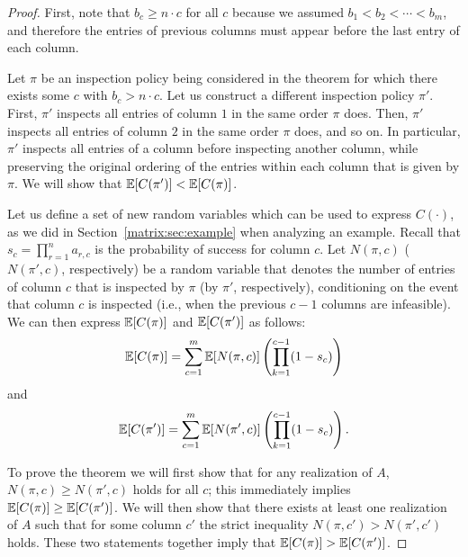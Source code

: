  \begin{proof}
 First, note that $b_c \geq n\cdot c$ for all $c$ because we assumed $b_1 < b_2 < \cdots < b_m$, and therefore the entries of previous columns must appear before the last entry of each column.

 Let $\pi$ be an inspection policy being considered in the theorem for which there exists some $c$ with $b_{c} > n \cdot c$.
 Let us construct a different inspection policy $\pi'$.
 First, $\pi'$ inspects all entries of column $1$ in the same order $\pi$ does. 
 Then, $\pi'$ inspects all entries of column $2$ in the same order $\pi$ does, and so on. 
 In particular, $\pi'$ inspects all entries of a column before inspecting another column, while preserving the original ordering of the entries within each column that is given by $\pi$. 
 We will show that $\mathbb{E}[C(\pi')] < \mathbb{E}[C(\pi)]$.

 Let us define a set of new random variables which can be used to express $C(\cdot)$, as we did in Section~\ref{matrix:sec:example} when analyzing an example.
 Recall that $s_c = \prod_{r=1}^{n} a_{r,c}$ is the probability of success for column $c$.
 Let $N(\pi, c)$ ($N(\pi', c)$, respectively) be a random variable that denotes the number of entries of column $c$ that is inspected by $\pi$ (by $\pi'$, respectively), conditioning on the event that column $c$ is inspected (i.e., when the previous $c-1$ columns are infeasible).
 We can then express $\mathbb{E}[C(\pi)]$ and $\mathbb{E}[C(\pi')]$ as follows:
 \begin{equation} \label{matrix:eqn:exp_c_pi_decoupled}
 	\mathbb{E}[C(\pi)] = \sum_{c=1}^{m} \mathbb{E}[N(\pi, c)]\left( \prod_{k=1}^{c-1} (1 - s_c) \right)
 \end{equation}
 and
 \begin{equation} \label{matrix:eqn:exp_c_pi2_decoupled}
 	\mathbb{E}[C(\pi')] = \sum_{c=1}^{m} \mathbb{E}[N(\pi', c)]\left( \prod_{k=1}^{c-1} (1 - s_c) \right).
 \end{equation}


 To prove the theorem we will first show that for any realization of $A$, $N(\pi, c) \geq N(\pi', c)$ holds for all $c$; this immediately implies $\mathbb{E}[C(\pi)] \geq \mathbb{E}[C(\pi')]$.
 We will then show that there exists at least one realization of $A$ such that for some column $c'$ the strict inequality $N(\pi, c') > N(\pi', c')$ holds. These two statements together imply that $\mathbb{E}[C(\pi)] > \mathbb{E}[C(\pi')]$.



\end{proof}
